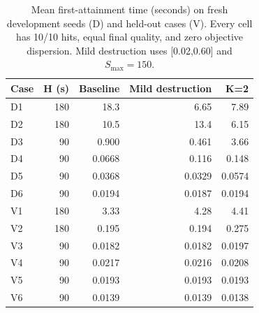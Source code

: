 \begin{table}[tbp]
\centering\small
\caption{Mean first-attainment time (seconds) on fresh development seeds (D) and held-out cases (V). Every cell has 10/10 hits, equal final quality, and zero objective dispersion. Mild destruction uses [0.02,0.60] and $S_{\mathrm{max}}=150$.}
\label{tab:confirmation}
\begin{tabular}{lrrrr}
\toprule
Case & H (s) & Baseline & Mild destruction & K=2\\
\midrule
D1 & 180 & 18.3 & 6.65 & 7.89\\
D2 & 180 & 10.5 & 13.4 & 6.15\\
D3 & 90 & 0.900 & 0.461 & 3.66\\
D4 & 90 & 0.0668 & 0.116 & 0.148\\
D5 & 90 & 0.0368 & 0.0329 & 0.0574\\
D6 & 90 & 0.0194 & 0.0187 & 0.0194\\
\midrule
V1 & 180 & 3.33 & 4.28 & 4.41\\
V2 & 180 & 0.195 & 0.194 & 0.275\\
V3 & 90 & 0.0182 & 0.0182 & 0.0197\\
V4 & 90 & 0.0217 & 0.0216 & 0.0208\\
V5 & 90 & 0.0193 & 0.0193 & 0.0193\\
V6 & 90 & 0.0139 & 0.0139 & 0.0138\\
\bottomrule
\end{tabular}
\end{table}
